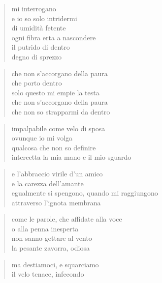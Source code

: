 \begin{volumetitlepage}
\end{volumetitlepage}


	\begin{verse}
		mi interrogano\\
		e io so solo intridermi\\
		di umidità fetente\\
		ogni fibra erta a nascondere\\
		il putrido di dentro\\
		degno di sprezzo
	\end{verse}

	\begin{verse}
		che non s’accorgano della paura\\
		che porto dentro\\
		solo questo mi empie la testa\\
		che non s’accorgano della paura\\
		che non so strapparmi da dentro
	\end{verse}

\clearpage


	\begin{verse}
		impalpabile come velo di sposa\\
		ovunque io mi volga\\
		qualcosa che non so definire\\
		intercetta la mia mano e il mio sguardo
	\end{verse}

	\begin{verse}
		e l'abbraccio virile d'un amico\\
		e la carezza dell'amante\\
		egualmente si spengono, quando mi raggiungono\\
		attraverso l'ignota membrana
	\end{verse}

	\begin{verse}
		come le parole, che affidate alla voce\\
		o alla penna inesperta\\
		non sanno gettare al vento\\
		la pesante zavorra, odiosa
	\end{verse}

	\begin{verse}
		ma destiamoci, e squarciamo\\
		il velo tenace, infecondo
	\end{verse}

